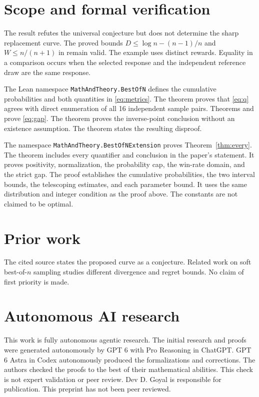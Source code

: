 \documentclass[11pt,a4paper]{article}
\begin{document}
\section{Scope and formal verification}
The result refutes the universal conjecture but does not determine the sharp replacement curve. The proved bounds $D\leq\log n-(n-1)/n$ and $W\leq n/(n+1)$ in \cite{beirami} remain valid. The example uses distinct rewards. Equality in a comparison occurs when the selected response and the independent reference draw are the same response.

The Lean namespace \texttt{MathAndTheory.BestOfN} defines the cumulative probabilities and both quantities in \eqref{eq:metrics}. The theorem  proves that \eqref{eq:q} agrees with direct enumeration of all 16 independent sample pairs. Theorems  and  prove \eqref{eq:gap}. The theorem  proves the inverse-point conclusion without an existence assumption. The theorem  states the resulting disproof.

The namespace \texttt{MathAndTheory.BestOfNExtension} proves Theorem~\ref{thm:every}. The theorem  includes every quantifier and conclusion in the paper's statement. It proves positivity, normalization, the probability cap, the win-rate domain, and the strict gap. The proof establishes the cumulative probabilities, the two interval bounds, the telescoping estimates, and each parameter bound. It uses the same distribution and integer condition as the proof above. The constants are not claimed to be optimal.

\section{Prior work}
The cited source states the proposed curve as a conjecture. Related work on soft best-of-$n$ sampling \cite{aminian} studies different divergence and regret bounds. No claim of first priority is made.

\section*{Autonomous AI research}
This work is fully autonomous agentic research. The initial research and proofs were generated autonomously by GPT 6 with Pro Reasoning in ChatGPT. GPT 6 Astra in Codex autonomously produced the formalizations and corrections. The authors checked the proofs to the best of their mathematical abilities. This check is not expert validation or peer review. Dev D. Goyal is responsible for publication. This preprint has not been peer reviewed.



\end{document}
